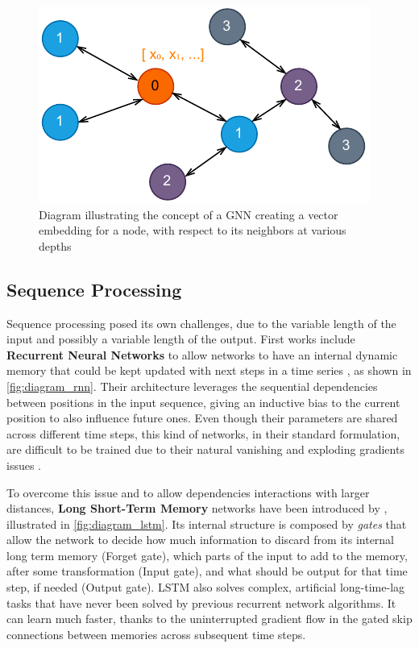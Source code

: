 \documentclass[../thesis.tex]{subfiles}
\begin{document}
\begin{figure}
    \centering
    \includegraphics[width=0.4\linewidth]{assets/GNN_Illustration.drawio.pdf}
    \caption{Diagram illustrating the concept of a GNN creating a vector embedding for a node, with respect to its neighbors at various depths}
    \label{fig:gnn_illustration}
\end{figure}

\subsection{Sequence Processing}
\label{sec:introduction__sequence_processing}
Sequence processing posed its own challenges, due to the variable length of the input and possibly a variable length of the output.
First works include \textbf{Recurrent Neural Networks} to allow networks to have an internal dynamic memory that could be kept updated with next steps in a time series \citep{ELMAN1990179rnn}, as shown in \cref{fig:diagram_rnn}. Their architecture leverages the sequential dependencies between positions in the input sequence, giving an inductive bias to the current position to also influence future ones. Even though their parameters are shared across different time steps, this kind of networks, in their standard formulation, are difficult to be trained due to their natural vanishing and exploding gradients issues \citep{bengio1994gradientdescent-rnn}.

To overcome this issue and to allow dependencies interactions with larger distances, \textbf{Long Short-Term Memory} networks have been introduced by \citeauthor{lstm}, illustrated in \cref{fig:diagram_lstm}.
Its internal structure is composed by \emph{gates} that allow the network 
to decide how much information to discard from its internal long term memory (Forget gate),
which parts of the input to add to the memory, after some transformation (Input gate),
and what should be output for that time step, if needed (Output gate).
LSTM also solves complex, artificial long-time-lag tasks that have never been solved by previous recurrent network algorithms. It can learn much faster, thanks to the uninterrupted gradient flow in the gated skip connections between memories across subsequent time steps.
\end{document}

